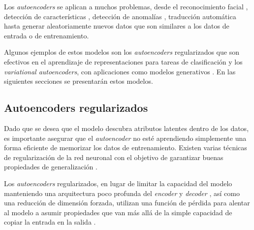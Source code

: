  Los \textit{autoencoders} se aplican a muchos problemas, desde el reconocimiento facial \cite{zeng2018facial, chen2018softmax}, detección de características \cite{masci2011stacked, rifai2011contractive}, detección de anomalías \cite{zhou2017anomaly, sakurada2014anomaly}, traducción automática \cite{BahdanauAlignTrans, SutskeverSeq2seqNN} hasta generar aleatoriamente nuevos datos que son similares a los datos de entrada o de entrenamiento.
 
Algunos ejemplos de estos modelos son los \textit{ autoencoders} regularizados que son efectivos en el aprendizaje de representaciones para tareas de clasificación \cite{AECClasif} y los \textit{variational autoencoders}, con aplicaciones como modelos generativos \cite{VAESurveyAplications, HottungBT21}. En las siguientes secciones se presentarán estos modelos.

\subsection{ Autoencoders regularizados}\label{2-RegAEC}

 Dado que se desea que el modelo descubra atributos latentes dentro de los datos, es importante asegurar que el \textit{autoencoder} no esté aprendiendo simplemente una forma eficiente de memorizar los datos de entrenamiento. Existen varias técnicas de regularización de la red neuronal con el objetivo de garantizar buenas propiedades de generalización \cite{BengioGood, Advanced}. 

Los \textit{autoencoders} regularizados, en lugar de limitar la capacidad del modelo manteniendo una arquitectura poco profunda del \textit{encoder} y \textit{decoder} , así como una reducción de dimensión forzada, utilizan una función de pérdida para alentar al modelo a asumir propiedades que van más allá de la simple capacidad de copiar la entrada en la salida \cite{BengioGood}. 



